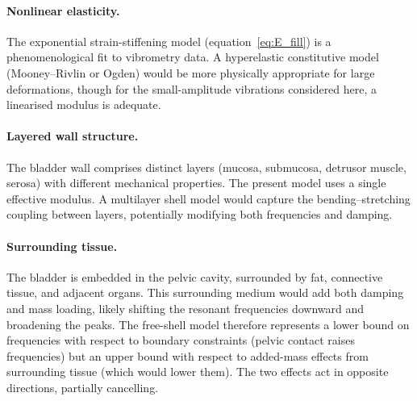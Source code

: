 \paragraph{Nonlinear elasticity.}
The exponential strain-stiffening model (equation~\ref{eq:E_fill}) is a
phenomenological fit to vibrometry data.  A hyperelastic constitutive model
(Mooney--Rivlin or Ogden) would be more physically appropriate for large
deformations, though for the small-amplitude vibrations considered here,
a linearised modulus is adequate.

\paragraph{Layered wall structure.}
The bladder wall comprises distinct layers (mucosa, submucosa, detrusor
muscle, serosa) with different mechanical properties.  The present model
uses a single effective modulus.  A multilayer shell model would capture
the bending--stretching coupling between layers, potentially modifying
both frequencies and damping.

\paragraph{Surrounding tissue.}
The bladder is embedded in the pelvic cavity, surrounded by fat, connective
tissue, and adjacent organs.  This surrounding medium would add both
damping and mass loading, likely shifting the resonant frequencies downward
and broadening the peaks.  The free-shell model therefore represents a
lower bound on frequencies with respect to boundary constraints (pelvic
contact raises frequencies) but an upper bound with respect to added-mass
effects from surrounding tissue (which would lower them).  The two effects
act in opposite directions, partially cancelling.
